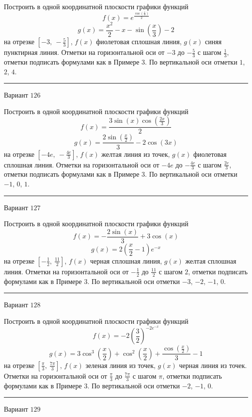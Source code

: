 \documentclass[11pt]{report}
\begin{document}
Построить в одной координатной плоскости графики функций $$f(x) = e^{\frac{\cos{\left(\frac{x}{3} \right)}}{2}}$$ $$g(x) = \frac{x^{2}}{2} - x - \sin{\left(\frac{x}{3} \right)} - 2$$ на отрезке $\left[-3, \  - \frac{5}{3}\right]$, $f(x)$ фиолетовая сплошная линия, $g(x)$ синяя пунктирная линия. Отметки на горизонтальной оси от $-3$ до $- \frac{5}{3}$ с шагом $\frac{1}{3}$, отметки подписать формулами как в Примере 3. По вертикальной оси отметки $1$, $2$, $4$.
\begin{center}
\noindent\rule{8cm}{0.4pt}
\end{center}
Вариант $126$


Построить в одной координатной плоскости графики функций $$f(x) = \frac{3 \sin{\left(x \right)} \cos{\left(\frac{2 x}{3} \right)}}{2}$$ $$g(x) = \frac{2 \sin{\left(\frac{x}{2} \right)}}{3} - 2 \cos{\left(3 x \right)}$$ на отрезке $\left[- 4 e, \  - \frac{4 e}{3}\right]$, $f(x)$ желтая линия из точек, $g(x)$ фиолетовая сплошная линия. Отметки на горизонтальной оси от $- 4 e$ до $- \frac{4 e}{3}$ с шагом $\frac{2 e}{3}$, отметки подписать формулами как в Примере 3. По вертикальной оси отметки $-1$, $0$, $1$.
\begin{center}
\noindent\rule{8cm}{0.4pt}
\end{center}
Вариант $127$


Построить в одной координатной плоскости графики функций $$f(x) = - \frac{2 \sin{\left(x \right)}}{3} + 3 \cos{\left(x \right)}$$ $$g(x) = 2 \left(\frac{x}{2} - 1\right) e^{- x}$$ на отрезке $\left[- \frac{1}{2}, \  \frac{11}{2}\right]$, $f(x)$ черная сплошная линия, $g(x)$ желтая сплошная линия. Отметки на горизонтальной оси от $- \frac{1}{2}$ до $\frac{11}{2}$ с шагом $2$, отметки подписать формулами как в Примере 3. По вертикальной оси отметки $-3$, $-2$, $-1$, $0$.
\begin{center}
\noindent\rule{8cm}{0.4pt}
\end{center}
Вариант $128$


Построить в одной координатной плоскости графики функций $$f(x) = - 2 \left(\frac{3}{2}\right)^{- 2 e^{- x}}$$ $$g(x) = 3 \cos^{3}{\left(\frac{x}{2} \right)} + \cos^{2}{\left(\frac{x}{2} \right)} + \frac{\cos{\left(\frac{x}{2} \right)}}{3} - 1$$ на отрезке $\left[\frac{\pi}{3}, \  \frac{7 \pi}{3}\right]$, $f(x)$ зеленая линия из точек, $g(x)$ черная линия из точек. Отметки на горизонтальной оси от $\frac{\pi}{3}$ до $\frac{7 \pi}{3}$ с шагом $\pi$, отметки подписать формулами как в Примере 3. По вертикальной оси отметки $-2$, $-1$, $0$.
\begin{center}
\noindent\rule{8cm}{0.4pt}
\end{center}
Вариант $129$
\end{document}
